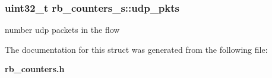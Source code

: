\subsubsection[{udp\+\_\+pkts}]{\setlength{\rightskip}{0pt plus 5cm}uint32\+\_\+t rb\+\_\+counters\+\_\+s\+::udp\+\_\+pkts}\label{structrb__counters__s_a0ae055dfa6bb939dbfb0d8fa0084e29c}


number udp packets in the flow 



The documentation for this struct was generated from the following file\+:\begin{DoxyCompactItemize}
\item 
{\bf rb\+\_\+counters.\+h}\end{DoxyCompactItemize}
